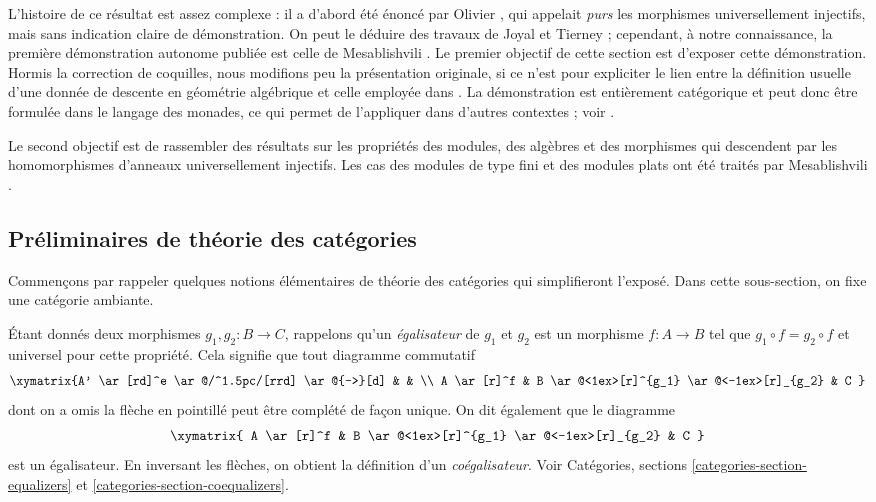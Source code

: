 \medskip\noindent
L'histoire de ce résultat est assez complexe : il a d'abord été énoncé
par Olivier \cite{olivier}, qui appelait {\it purs} les morphismes
universellement injectifs, mais sans indication claire de démonstration.
On peut le déduire des travaux de Joyal et Tierney \cite{joyal-tierney} ;
cependant, à notre connaissance, la première démonstration autonome publiée
est celle de Mesablishvili \cite{mesablishvili1}.
Le premier objectif de cette section est d'exposer cette démonstration.
Hormis la correction de coquilles, nous modifions peu la présentation originale,
si ce n'est pour expliciter le lien entre la définition usuelle
d'une donnée de descente en géométrie algébrique et celle
employée dans \cite{mesablishvili1}.
La démonstration est entièrement catégorique et peut donc être formulée
dans le langage des monades, ce qui permet de l'appliquer
dans d'autres contextes ; voir \cite{janelidze-tholen}.

\medskip\noindent
Le second objectif est de rassembler des résultats sur les propriétés
des modules, des algèbres et des morphismes qui descendent par
les homomorphismes d'anneaux universellement injectifs.
Les cas des modules de type fini et des modules plats ont été traités
par Mesablishvili \cite{mesablishvili2}.


\subsection{Préliminaires de théorie des catégories}
\label{subsection-category-prelims}

\noindent
Commençons par rappeler quelques notions élémentaires de théorie des catégories
qui simplifieront l'exposé. Dans cette sous-section, on fixe une catégorie ambiante.

\medskip\noindent
Étant donnés deux morphismes $g_1, g_2: B \to C$, rappelons qu'un
{\it égalisateur} de $g_1$ et $g_2$ est un morphisme $f: A \to B$ tel que
$g_1 \circ f = g_2 \circ f$ et universel pour cette propriété.
Cela signifie que tout diagramme commutatif
$$
\xymatrix{A' \ar[rd]^e \ar@/^1.5pc/[rrd] \ar@{-->}[d] & & \\
A \ar[r]^f & B \ar@<1ex>[r]^{g_1} \ar@<-1ex>[r]_{g_2} & 
C
}
$$
dont on a omis la flèche en pointillé peut être complété de façon unique.
On dit également que le diagramme
\begin{equation}
\label{equation-equalizer}
\xymatrix{
A \ar[r]^f  & B \ar@<1ex>[r]^{g_1} \ar@<-1ex>[r]_{g_2} & C
}
\end{equation}
est un égalisateur. En inversant les flèches, on obtient la définition
d'un {\it coégalisateur}.
Voir Catégories, sections \ref{categories-section-equalizers} et
\ref{categories-section-coequalizers}.


